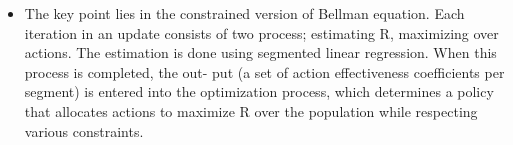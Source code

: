 \documentclass{article}
\theoremstyle{remark}
\theoremstyle{remark}
\theoremstyle{remark}
\theoremstyle{remark}
\theoremstyle{remark}
\theoremstyle{remark}
\begin{document}
\begin{itemize}
	\item The key point lies in the constrained version of Bellman equation. Each iteration in an update consists of two process; estimating R, maximizing over actions. The estimation is done using segmented linear regression. When this process is completed, the out- put (a set of action effectiveness coefficients per segment) is entered into the optimization process, which determines a policy that allocates actions to maximize R over the population while respecting various constraints.

\end{itemize}




\end{document}
